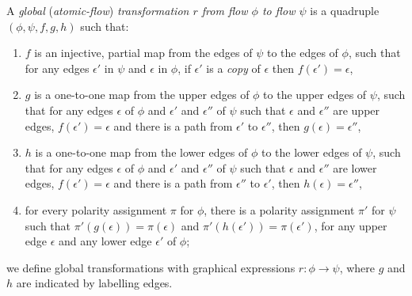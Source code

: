 \begin{definition}
A \emph{global} (\emph{atomic-flow}) \emph{transformation $r$ from flow $\phi$ to flow $\psi$} is a quadruple $(\phi,\psi,f,g,h)$ such that:
\begin{enumerate}
\item $f$ is an injective, partial map from the edges of $\psi$ to the edges of $\phi$, such that for any edges $\epsilon'$ in $\psi$ and $\epsilon$ in $\phi$, if $\epsilon'$ is a \emph{copy} of $\epsilon$ then $f(\epsilon')=\epsilon$,
\item $g$ is a one-to-one map from the upper edges of $\phi$ to the upper edges of $\psi$, such that for any edges $\epsilon$ of $\phi$ and $\epsilon'$ and $\epsilon''$ of $\psi$ such that $\epsilon$ and $\epsilon''$ are upper edges, $f(\epsilon')=\epsilon$ and there is a path from $\epsilon'$ to $\epsilon''$, then $g(\epsilon)=\epsilon''$,
\item $h$ is a one-to-one map from the lower edges of $\phi$ to the lower edges of $\psi$, such that for any edges $\epsilon$ of $\phi$ and $\epsilon'$ and $\epsilon''$ of $\psi$ such that $\epsilon$ and $\epsilon''$ are lower edges, $f(\epsilon')=\epsilon$ and there is a path from $\epsilon''$ to $\epsilon'$, then $h(\epsilon)=\epsilon''$,
\item for every polarity assignment $\pi$ for $\phi$, there is a polarity assignment $\pi'$ for $\psi$ such that $\pi'(g(\epsilon))=\pi(\epsilon)$ and $\pi'(h(\epsilon'))=\pi(\epsilon')$, for any upper edge $\epsilon$ and any lower edge $\epsilon'$ of $\phi$;
\end{enumerate}
we define global transformations with graphical expressions $r\colon\phi\to\psi$, where $g$ and $h$ are indicated by labelling edges.
\end{definition}